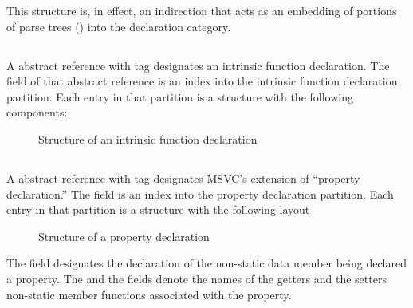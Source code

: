 This structure is, in effect, an indirection that acts as an embedding of portions of parse trees ()
into the declaration category.




\subsection{} 
\label{sec:ifc:DeclSort:Intrinsic}

A  abstract reference with tag  designates an intrinsic function declaration.
The  field of that abstract reference is an index into the intrinsic function declaration partition.
Each entry in that partition is a structure with the following components:
%
\begin{figure}[H]
	\centering
	\caption{Structure of an intrinsic function declaration}
	\label{fig:ifc-intrinsic-decl-structure}
\end{figure}
%




\subsection{}
\label{sec:ifc:DeclSort:Property}

A  abstract reference with tag 
designates MSVC's extension of ``property declaration.''  The 
field is an index into the property declaration partition.  Each entry in that partition
is a structure with the following layout
%
\begin{figure}[H]
	\centering
	\caption{Structure of a property declaration}
	\label{fig:ifc-property-declaration-structure}
\end{figure}
%
The  field designates the declaration of the non-static data member
being declared a property.  The  and the  fields 
denote the names of the getters and the setters non-static member functions associated
with the property.

